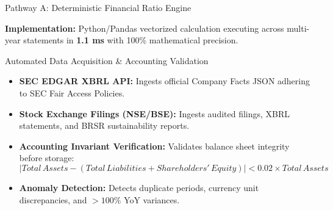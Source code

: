 \documentclass[aspectratio=169,10pt]{beamer}
\begin{document}
\begin{frame}{Pathway A: Deterministic Financial Ratio Engine}
\begin{table}[h]
\centering
{}
\end{table}
\textbf{Implementation:} Python/Pandas vectorized calculation executing across multi-year statements in \textbf{1.1 ms} with 100\% mathematical precision.
\end{frame}

\begin{frame}{Automated Data Acquisition \& Accounting Validation}
\begin{itemize}
    \item \textbf{SEC EDGAR XBRL API:} Ingests official Company Facts JSON adhering to SEC Fair Access Policies.
    \item \textbf{Stock Exchange Filings (NSE/BSE):} Ingests audited filings, XBRL statements, and BRSR sustainability reports.
    \item \textbf{Accounting Invariant Verification:} Validates balance sheet integrity before storage:
    $$|Total\,Assets - (Total\,Liabilities + Shareholders'\,Equity)| < 0.02 \times Total\,Assets$$
    \item \textbf{Anomaly Detection:} Detects duplicate periods, currency unit discrepancies, and $>100\%$ YoY variances.
\end{itemize}
\end{frame}
\end{document}
